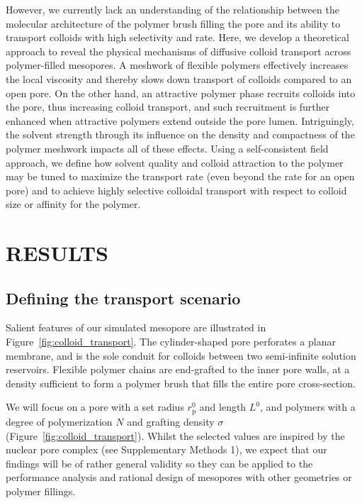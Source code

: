 \documentclass[12pt, a4paper]{article}
\begin{document}
However, we currently lack an understanding of the relationship between the molecular architecture of the polymer brush filling the pore and its ability to transport colloids with high selectivity and rate. Here, we develop a theoretical approach to reveal the physical mechanisms of diffusive colloid transport across polymer-filled mesopores.
A meshwork of flexible polymers effectively increases the local viscosity and thereby slows down transport of colloids compared to an open pore. 
On the other hand, an attractive polymer phase recruits colloids into the pore, thus increasing colloid transport, and such recruitment is further enhanced when attractive polymers extend outside the pore lumen. 
Intriguingly, the solvent strength through its influence on the density and compactness of the polymer meshwork impacts all of these effects. 
Using a self-consistent field approach, we define how solvent quality and colloid attraction to the polymer may be tuned to maximize the transport rate (even beyond the rate for an open pore) and to achieve highly selective colloidal transport with respect to colloid size or affinity for the polymer.


\section{RESULTS}


\subsection{Defining the transport scenario}

Salient features of our simulated mesopore are illustrated in Figure~\ref{fig:colloid_transport}.
The cylinder-shaped pore perforates a planar membrane, and is the sole conduit for colloids between two semi-infinite solution reservoirs.
Flexible polymer chains are end-grafted to the inner pore walls, at a density sufficient to form a polymer brush that fills the entire pore cross-section.

We will focus on a pore with a set radius $r_{\text{p}}^0$ and length $L^0$, and polymers with a degree of polymerization $N$ and grafting density $\sigma$ (Figure~\ref{fig:colloid_transport}).
Whilst the selected values are inspired by the nuclear pore complex (see Supplementary Methods 1), we expect that our findings will be of rather general validity so they can be applied to the performance analysis and rational design of mesopores with other geometries or polymer fillings.
\end{document}
